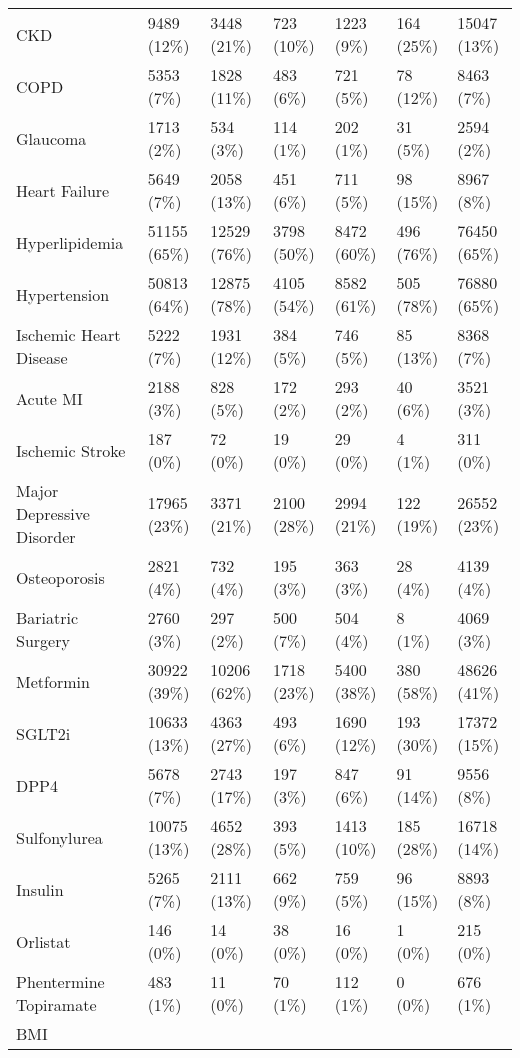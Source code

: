 \begin{longtable}{p{}p{}p{}p{}p{}p{}p{}}
  CKD & 9489 (12\%) & 3448 (21\%) & 723 (10\%) & 1223 (9\%) & 164 (25\%) & 15047 (13\%) \\ 
  COPD & 5353 (7\%) & 1828 (11\%) & 483 (6\%) & 721 (5\%) & 78 (12\%) & 8463 (7\%) \\ 
  Glaucoma & 1713 (2\%) & 534 (3\%) & 114 (1\%) & 202 (1\%) & 31 (5\%) & 2594 (2\%) \\ 
  Heart Failure & 5649 (7\%) & 2058 (13\%) & 451 (6\%) & 711 (5\%) & 98 (15\%) & 8967 (8\%) \\ 
  Hyperlipidemia & 51155 (65\%) & 12529 (76\%) & 3798 (50\%) & 8472 (60\%) & 496 (76\%) & 76450 (65\%) \\ 
  Hypertension & 50813 (64\%) & 12875 (78\%) & 4105 (54\%) & 8582 (61\%) & 505 (78\%) & 76880 (65\%) \\ 
  Ischemic Heart Disease & 5222 (7\%) & 1931 (12\%) & 384 (5\%) & 746 (5\%) & 85 (13\%) & 8368 (7\%) \\ 
  Acute MI & 2188 (3\%) & 828 (5\%) & 172 (2\%) & 293 (2\%) & 40 (6\%) & 3521 (3\%) \\ 
  Ischemic Stroke & 187 (0\%) & 72 (0\%) & 19 (0\%) & 29 (0\%) & 4 (1\%) & 311 (0\%) \\ 
  Major Depressive Disorder & 17965 (23\%) & 3371 (21\%) & 2100 (28\%) & 2994 (21\%) & 122 (19\%) & 26552 (23\%) \\ 
  Osteoporosis & 2821 (4\%) & 732 (4\%) & 195 (3\%) & 363 (3\%) & 28 (4\%) & 4139 (4\%) \\ 
  Bariatric Surgery & 2760 (3\%) & 297 (2\%) & 500 (7\%) & 504 (4\%) & 8 (1\%) & 4069 (3\%) \\ 
  Metformin & 30922 (39\%) & 10206 (62\%) & 1718 (23\%) & 5400 (38\%) & 380 (58\%) & 48626 (41\%) \\ 
  SGLT2i & 10633 (13\%) & 4363 (27\%) & 493 (6\%) & 1690 (12\%) & 193 (30\%) & 17372 (15\%) \\ 
  DPP4 & 5678 (7\%) & 2743 (17\%) & 197 (3\%) & 847 (6\%) & 91 (14\%) & 9556 (8\%) \\ 
  Sulfonylurea & 10075 (13\%) & 4652 (28\%) & 393 (5\%) & 1413 (10\%) & 185 (28\%) & 16718 (14\%) \\ 
  Insulin & 5265 (7\%) & 2111 (13\%) & 662 (9\%) & 759 (5\%) & 96 (15\%) & 8893 (8\%) \\ 
  Orlistat & 146 (0\%) & 14 (0\%) & 38 (0\%) & 16 (0\%) & 1 (0\%) & 215 (0\%) \\ 
  Phentermine Topiramate & 483 (1\%) & 11 (0\%) & 70 (1\%) & 112 (1\%) & 0 (0\%) & 676 (1\%) \\ 
  BMI &  &  &  &  &  &  \\ 

\end{longtable}
